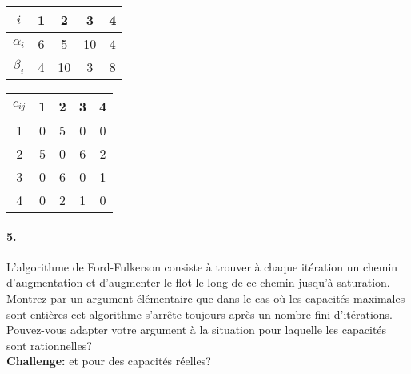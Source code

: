 \begin{multicols}{2}

\begin{center}
\begin{tabular}{||c||c|c|c|c||}
\hline
$i$ & 1 & 2 & 3 & 4 \\ 
\hline
$\alpha_i$ & 6 & 5 & 10 & 4 \\
\hline
$\beta_i$ & 4 & 10 & 3 & 8 \\
\hline
\end{tabular}
\end{center}

\columnbreak


\begin{center}
\begin{tabular}{||c||c|c|c|c||}
\hline
$c_{ij}$ & 1 & 2 & 3 & 4 \\ 
\hline
1 & 0 & 5 & 0 & 0 \\
\hline
2 & 5 & 0 & 6 & 2 \\
\hline
3 & 0 & 6 & 0 & 1 \\
\hline 
4 & 0 & 2 & 1 & 0 \\
\hline
\end{tabular}
\end{center}

\end{multicols}

\paragraph{5. } L'algorithme de Ford-Fulkerson consiste à trouver à chaque itération un chemin d'augmentation et d'augmenter le flot le long de ce chemin jusqu'à saturation. Montrez par un argument élémentaire que dans le cas où les capacités maximales sont entières cet algorithme s'arrête toujours après un nombre fini d'itérations. Pouvez-vous adapter votre argument à la situation pour laquelle les capacités sont rationnelles? \\
\textbf{Challenge:} et pour des capacités réelles? 

